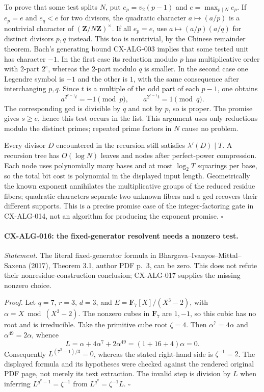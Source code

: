 \documentclass[11pt,a4paper]{article}
\begin{document}
To prove that some test splits $N$, put
$e_p=v_2(p-1)$ and $e=\max_{p\mid N}e_p$. If $e_p=e$ and $e_q<e$ for
two divisors, the quadratic character $a\mapsto(a/p)$ is a nontrivial
character of $(\mathbf Z/N\mathbf Z)^\times$. If all $e_p=e$, use
$a\mapsto(a/p)(a/q)$ for distinct divisors $p,q$ instead. This too is
nontrivial, by the Chinese remainder theorem. Bach's generating bound
CX-ALG-003 implies that some tested unit has character $-1$.
In the first case its reduction modulo $p$ has multiplicative order with
2-part $2^e$, whereas the 2-part modulo $q$ is smaller. In the second
case one Legendre symbol is $-1$ and the other is $1$, with the same
consequence after interchanging $p,q$. Since $t$ is a multiple of the odd
part of each $p-1$, one obtains
\[
       a^{2^{e-1}t}=-1\pmod p,\qquad
       a^{2^{e-1}t}=1\pmod q.
\]
The corresponding gcd is divisible by $q$ and not by $p$, so is proper.
The promise gives $s\ge e$, hence this test occurs in the list. This
argument uses only reductions modulo the distinct primes; repeated prime
factors in $N$ cause no problem.

Every divisor $D$ encountered in the recursion still satisfies
$\lambda'(D)\mid T$. A recursion tree has $O(\log N)$ leaves and nodes
after perfect-power compression. Each node uses polynomially many bases
and at most $\log_2T$ squarings per base, so the total bit cost is
polynomial in the displayed input length. Geometrically the known exponent
annihilates the multiplicative groups of the reduced residue fibers;
quadratic characters separate two unknown fibers and a gcd recovers their
different supports. This is a precise promise case of the integer-factoring
gate in CX-ALG-014, not an algorithm for producing the exponent promise.
\hfill$\square$

\paragraph{CX-ALG-016: the fixed-generator resolvent needs a nonzero test.}
\emph{Statement.} The literal fixed-generator formula in
Bhargava--Ivanyos--Mittal--Saxena (2017), Theorem 3.1, author PDF p.~3,
can be zero. This does not refute their nonresidue-construction conclusion;
CX-ALG-017 supplies the missing nonzero choice.

\emph{Proof.} Let $q=7$, $r=3$, $d=3$, and
$E=\mathbf F_7[X]/(X^3-2)$, with $\alpha=X\bmod(X^3-2)$.
The nonzero cubes in $\mathbf F_7$ are $1,-1$, so this cubic has no root
and is irreducible. Take the primitive cube root $\zeta=4$. Then
$\alpha^7=4\alpha$ and $\alpha^{49}=2\alpha$, whence
\[
 L=\alpha+4\alpha^7+2\alpha^{49}
   =(1+16+4)\alpha=0.
\]
Consequently $L^{(7^3-1)/3}=0$, whereas the stated right-hand side is
$\zeta^{-1}=2$. The displayed formula and its hypotheses were checked
against the rendered original PDF page, not merely its text extraction.
The invalid step is division by $L$ when inferring
$L^{q^k-1}=\zeta^{-1}$ from $L^{q^k}=\zeta^{-1}L$.
\hfill$\square$
\end{document}
